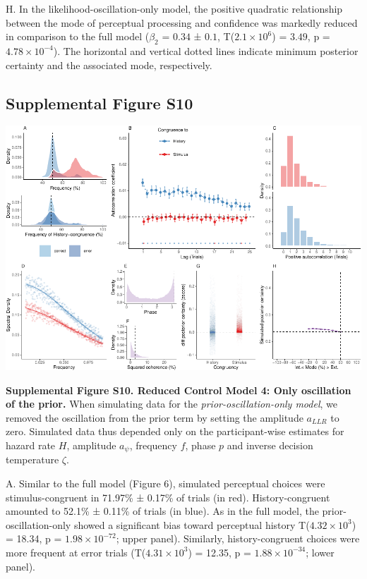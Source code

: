 \documentclass[
]{article}
\begin{document}
H. In the likelihood-oscillation-only model, the positive quadratic
relationship between the mode of perceptual processing and confidence
was markedly reduced in comparison to the full model (\(\beta_2\) =
\(0.34\) ± \(0.1\), T(\(\ensuremath{2.1\times 10^{6}}\)) = \(3.49\), p =
\(\ensuremath{4.78\times 10^{-4}}\)). The horizontal and vertical dotted
lines indicate minimum posterior certainty and the associated mode,
respectively.

\newpage

\hypertarget{supplemental-figure-s10}{%
\subsection{Supplemental Figure S10}\label{supplemental-figure-s10}}

\includegraphics{modes_mouse_files/figure-latex/Supplemental_Figure_S10-1.pdf}

\textbf{Supplemental Figure S10. Reduced Control Model 4: Only
oscillation of the prior.} When simulating data for the
\emph{prior-oscillation-only model}, we removed the oscillation from the
prior term by setting the amplitude \(a_{LLR}\) to zero. Simulated data
thus depended only on the participant-wise estimates for hazard rate
\(H\), amplitude \(a_{\psi}\), frequency \(f\), phase \(p\) and inverse
decision temperature \(\zeta\).

A. Similar to the full model (Figure 6), simulated perceptual choices
were stimulus-congruent in 71.97\% ± 0.17\% of trials (in red).
History-congruent amounted to 52.1\% ± 0.11\% of trials (in blue). As in
the full model, the prior-oscillation-only showed a significant bias
toward perceptual history T(\ensuremath{4.32\times 10^{3}}) = 18.34, p =
\(\ensuremath{1.98\times 10^{-72}}\); upper panel). Similarly,
history-congruent choices were more frequent at error trials
(T(\ensuremath{4.31\times 10^{3}}) = 12.35, p =
\(\ensuremath{1.88\times 10^{-34}}\); lower panel).
\end{document}
